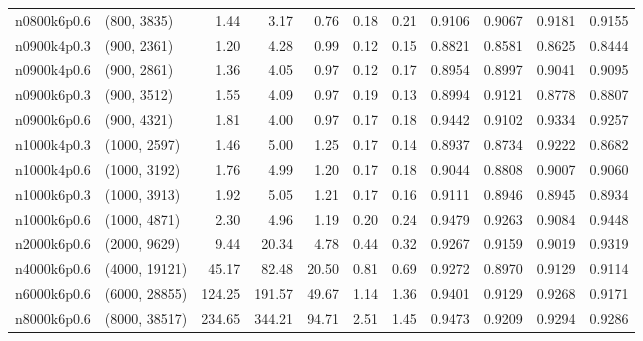 \begin{tabular}{llrrrrrrrrr}
n0800k6p0.6 &   (800, 3835) &   1.44 &   3.17 &  0.76 &  0.18 &   0.21 &   0.9106 &   0.9067 &     0.9181 &      0.9155 \\
n0900k4p0.3 &   (900, 2361) &   1.20 &   4.28 &  0.99 &  0.12 &   0.15 &   0.8821 &   0.8581 &     0.8625 &      0.8444 \\
n0900k4p0.6 &   (900, 2861) &   1.36 &   4.05 &  0.97 &  0.12 &   0.17 &   0.8954 &   0.8997 &     0.9041 &      0.9095 \\
n0900k6p0.3 &   (900, 3512) &   1.55 &   4.09 &  0.97 &  0.19 &   0.13 &   0.8994 &   0.9121 &     0.8778 &      0.8807 \\
n0900k6p0.6 &   (900, 4321) &   1.81 &   4.00 &  0.97 &  0.17 &   0.18 &   0.9442 &   0.9102 &     0.9334 &      0.9257 \\
n1000k4p0.3 &  (1000, 2597) &   1.46 &   5.00 &  1.25 &  0.17 &   0.14 &   0.8937 &   0.8734 &     0.9222 &      0.8682 \\
n1000k4p0.6 &  (1000, 3192) &   1.76 &   4.99 &  1.20 &  0.17 &   0.18 &   0.9044 &   0.8808 &     0.9007 &      0.9060 \\
n1000k6p0.3 &  (1000, 3913) &   1.92 &   5.05 &  1.21 &  0.17 &   0.16 &   0.9111 &   0.8946 &     0.8945 &      0.8934 \\
n1000k6p0.6 &  (1000, 4871) &   2.30 &   4.96 &  1.19 &  0.20 &   0.24 &   0.9479 &   0.9263 &     0.9084 &      0.9448 \\
n2000k6p0.6 &  (2000, 9629) &   9.44 &  20.34 &  4.78 &  0.44 &   0.32 &   0.9267 &   0.9159 &     0.9019 &      0.9319 \\
n4000k6p0.6 & (4000, 19121) &  45.17 &  82.48 & 20.50 &  0.81 &   0.69 &   0.9272 &   0.8970 &     0.9129 &      0.9114 \\
n6000k6p0.6 & (6000, 28855) & 124.25 & 191.57 & 49.67 &  1.14 &   1.36 &   0.9401 &   0.9129 &     0.9268 &      0.9171 \\
n8000k6p0.6 & (8000, 38517) & 234.65 & 344.21 & 94.71 &  2.51 &   1.45 &   0.9473 &   0.9209 &     0.9294 &      0.9286 \\
\bottomrule
\end{tabular}
